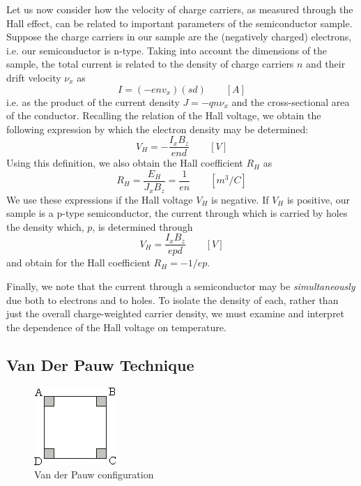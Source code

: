 \documentclass{../lab}
\begin{document}
Let us now consider how the velocity of charge carriers, as measured through the Hall effect, can be related to important parameters of the semiconductor sample. Suppose the charge carriers in our sample are the (negatively charged) electrons, i.e. our semiconductor is n-type. Taking into account the dimensions of the sample, the total current is related to the density of charge carriers $n$ and their drift velocity $\nu_x$ as
\begin{equation}
    I=(-e n v_x)(sd) \qquad [A]
\end{equation}
i.e. as the product of the current density $J = -q n \nu_x$ and the cross-sectional area of the conductor. Recalling the relation of the Hall voltage, we obtain the following expression by which the electron density may be determined:
\begin{equation}\label{eq:VH1}
    V_H = -\frac{I_x B_z}{end} \qquad [V]
\end{equation}
Using this definition, we also obtain the Hall coefficient $R_H$ as
\begin{equation}
    R_H=\frac{E_H}{J_x B_z} = \frac{1}{en} \qquad[m^3/C]
\end{equation}
We use these expressions if the Hall voltage $V_H$ is negative. If $V_H$ is positive, our sample is a p-type semiconductor, the current through which is carried by holes the density which, $p$, is determined through
\begin{equation}\label{eq:VH2}
    V_H=\frac{I_xB_z}{epd} \qquad [V]
\end{equation}
and obtain for the Hall coefficient $R_H = -1/ep$.

Finally, we note that the current through a semiconductor may be \emph{simultaneously} due both to electrons and to holes. To isolate the density of each, rather than just the overall charge-weighted carrier density, we must examine and interpret the dependence of the Hall voltage on temperature.

\subsection{Van Der Pauw Technique}

\begin{figure}[h]
    \centering
    \includegraphics[width=0.5\linewidth]{images/VanDerPauwConfiguration.png}
    \caption{Van der Pauw configuration}
    \label{fig:VdPConfig}
\end{figure}
\end{document}
